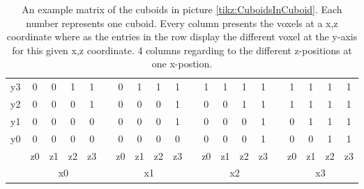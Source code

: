 \begin{table}[ht]
\centering
\caption[A matrix to determine which voxel is within the sphere or not]{An example matrix of the cuboids in picture \ref{tikz:CuboidsInCuboid}. Each number represents one cuboid. Every column presents the voxels at a x,z coordinate where as the entries in the row display the different voxel at the y-axis for this given x,z coordinate. 4 columns regarding to the different z-positions at one x-postion.  \newline}
\renewcommand{\arraystretch}{1.5}
	\begin{tabularx}{\textwidth}{cccccccccccccccccccc}
		y3 & 0 & 0 & 1 & 1 & &  0 & 1 & 1 & 1 & & 1 & 1 & 1 & 1 & & 1 & 1 & 1 & 1 \\
		y2 & 0 & 0 & 0 & 1 & &  0 & 0 & 0 & 1 & & 0 & 0 & 1 & 1 & & 1 & 1 & 1 & 1 \\
		y1 & 0 & 0 & 0 & 0 & &  0 & 0 & 0 & 1 & & 0 & 0 & 0 & 1 & & 0 & 1 & 1 & 1 \\
		y0 & 0 & 0 & 0 & 0 & &  0 & 0 & 0 & 0 & & 0 & 0 & 0 & 1 & & 0 & 0 & 1 & 1 \\
		   & z0 & z1 & z2 & z3 & & z0 & z1 & z2 & z3 & & z0 & z1 & z2 & z3 & & z0 & z1 & z2 & z3 \\
		   & \multicolumn{4}{c}{x0} & & \multicolumn{4}{c}{x1} & & \multicolumn{4}{c}{x2} & & \multicolumn{4}{c}{x3} 

	\end{tabularx}
	\label{tbl:MatrixCuboidsInCuboidSphere}
\end{table}